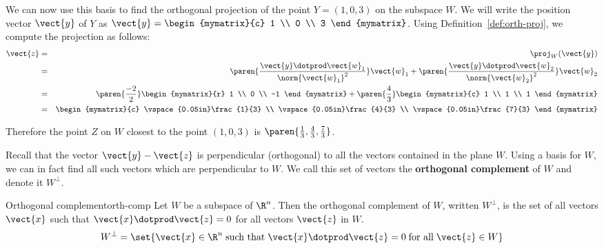 \begin{solution}
We can now use this basis to find the orthogonal projection of the
point $Y=(1,0,3)$ on the subspace $W$. We will write the position
vector $\vect{y}$ of $Y$ as $\vect{y} = \begin{mymatrix}{c} 1 \\ 0 \\ 3
\end{mymatrix}$. Using Definition~\ref{def:orth-proj}, we compute the projection as follows:
\begin{eqnarray*}
\vect{z} &=& \proj_{W}(\vect{y})\\
&=&
\paren{\frac{\vect{y} \dotprod \vect{w}_1}{ \norm{\vect{w}_1}^2}} \vect{w}_1
+
\paren{\frac{\vect{y} \dotprod \vect{w}_2}{ \norm{\vect{w}_2}^2}} \vect{w}_2 \\
&=&
\paren{\frac{-2}{2}} \begin{mymatrix}{r}
1 \\
0 \\
-1
\end{mymatrix}
+
\paren{\frac{4}{3}}
\begin{mymatrix}{c}
1 \\
1 \\
1
\end{mymatrix} \\
&=&
\begin{mymatrix}{c}
\vspace{0.05in}\frac{1}{3} \\
\vspace{0.05in}\frac{4}{3} \\
\vspace{0.05in}\frac{7}{3}
\end{mymatrix}
\end{eqnarray*}

Therefore the point $Z$ on $W$ closest to the point $(1,0,3)$  is $\paren{\frac{1}{3}, \frac{4}{3}, \frac{7}{3}}$.

\end{solution}

Recall that the vector $\vect{y} - \vect{z}$ is perpendicular
(orthogonal) to all the vectors contained in the plane $W$. Using a
basis for $W$, we can in fact find all such vectors which are
perpendicular to $W$. We call this set of vectors the
\textbf{orthogonal complement} of $W$ and
denote it $W^{\perp}$.

\begin{definition}{Orthogonal complement}{orth-comp}
Let $W$ be a subspace of $\R^n$. Then the orthogonal
complement of $W$, written $W^{\perp}$, is the set of all vectors
$\vect{x}$ such that $\vect{x} \dotprod \vect{z} = 0$ for all vectors
$\vect{z}$ in $W$.
\[
W^{\perp} = \set{\vect{x} \in \R^n \; \mbox{such that} \;
\vect{x} \dotprod \vect{z} = 0 \; \mbox{for all} \; \vect{z} \in W}
\]
\end{definition}

